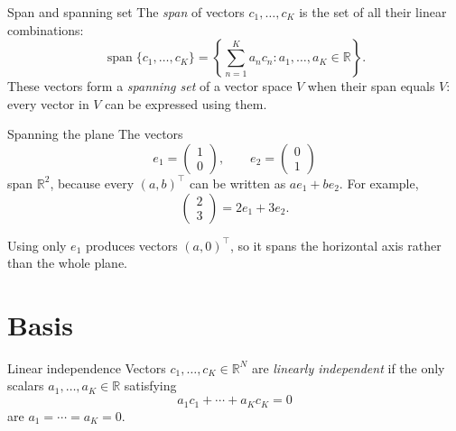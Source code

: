 \documentclass[a4paper,12pt,oneside]{report}
\begin{document}
\begin{frameddefn}{Span and spanning set}\label{def:span}
The \emph{span} of vectors $c_1,\ldots,c_K$ is the set of all their
linear combinations:
\[
  \operatorname{span}\{c_1,\ldots,c_K\}
  =\left\{\sum_{n=1}^{K}a_nc_n:a_1,\ldots,a_K\in\mathbb{R}\right\}.
\]
These vectors form a \emph{spanning set} of a vector space $V$ when
their span equals $V$: every vector in $V$ can be expressed using them.
\end{frameddefn}

\begin{framedexample}{Spanning the plane}
The vectors
\[
  e_1=\begin{pmatrix}1\\0\end{pmatrix},\qquad
  e_2=\begin{pmatrix}0\\1\end{pmatrix}
\]
span $\mathbb{R}^{2}$, because every $(a,b)^\top$ can be written as
$a e_1+b e_2$. For example,
\[
  \begin{pmatrix}2\\3\end{pmatrix}=2e_1+3e_2.
\]
\begin{center}
\end{center}
Using only $e_1$ produces vectors $(a,0)^\top$, so it spans the
horizontal axis rather than the whole plane.
\end{framedexample}

\clearpage
\section{Basis}

\begin{frameddefn}{Linear independence}\label{def:linear-independence}
Vectors $c_1,\ldots,c_K\in\mathbb{R}^{N}$ are \emph{linearly independent}
if the only scalars $a_1,\ldots,a_K\in\mathbb{R}$ satisfying
\[
  a_1c_1+\cdots+a_Kc_K=0
\]
are $a_1=\cdots=a_K=0$.
\end{frameddefn}
\end{document}
